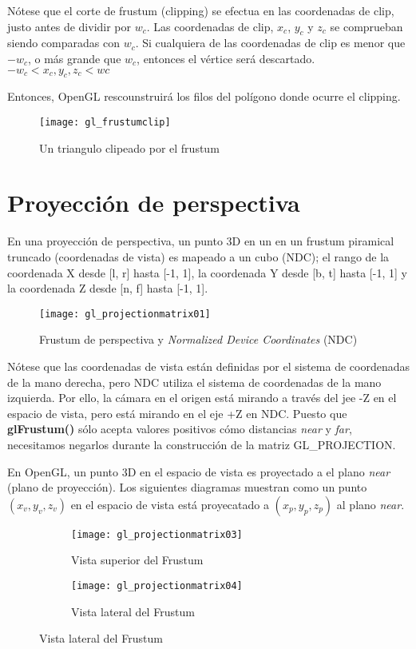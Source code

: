 Nótese que el corte de frustum (clipping) se efectua en las coordenadas de clip, justo antes de dividir por $w_c$. Las coordenadas de clip, $x_c$, $y_c$ y $z_c$ se comprueban siendo comparadas con $w_c$. Si cualquiera de las coordenadas de clip es menor que $-w_c$, o más grande que $w_c$, entonces el vértice será descartado.
$ -w_c < x_c, y_c, z_c < wc $

Entonces, OpenGL rescounstruirá los filos del polígono donde ocurre el clipping.

\begin{figure} [h]
  \centering
  \texttt{[image: gl\_frustumclip]}
  \caption{Un triangulo clipeado por el frustum}
\end{figure}

\section{Proyección de perspectiva}
En una proyección de perspectiva, un punto 3D en un en un frustum piramical truncado (coordenadas de vista) es mapeado a un cubo (NDC); el rango de la coordenada X desde [l, r] hasta [-1, 1], la coordenada Y desde [b, t] hasta [-1, 1] y la coordenada Z desde [n, f] hasta [-1, 1].

\begin{figure} [h]
  \centering
  \texttt{[image: gl\_projectionmatrix01]}
  \caption{Frustum de perspectiva y \textit{Normalized Device Coordinates} (NDC)}
\end{figure}


\newpage

Nótese que las coordenadas de vista están definidas por el sistema de coordenadas de la mano derecha, pero NDC utiliza el sistema de coordenadas de la mano izquierda. Por ello, la cámara en el origen está mirando a través del jee -Z en el espacio de vista, pero está mirando en el eje +Z en NDC. Puesto que \textbf{glFrustum()} sólo acepta valores positivos cómo distancias \textit{near} y \textit{far}, necesitamos negarlos durante la construcción de la matriz GL\_PROJECTION.

En OpenGL, un punto 3D en el espacio de vista es proyectado a el plano \textit{near} (plano de proyección). Los siguientes diagramas muestran como un punto $(x_v, y_v, z_v)$ en el espacio de vista está proyecatado a $(x_p, y_p, z_p)$ al plano \textit{near}.

\begin{figure} [h]
  \centering
  \captionsetup[subfigure]{justification=centering}
  \begin{subfigure}{0.3\textwidth} 
    \texttt{[image: gl\_projectionmatrix03]} 
    \caption{Vista superior del Frustum}
  \end{subfigure}
  \begin{subfigure}{0.3\textwidth}
    \texttt{[image: gl\_projectionmatrix04]} 
    \caption{Vista lateral del Frustum}
  \end{subfigure}
\end{figure}

